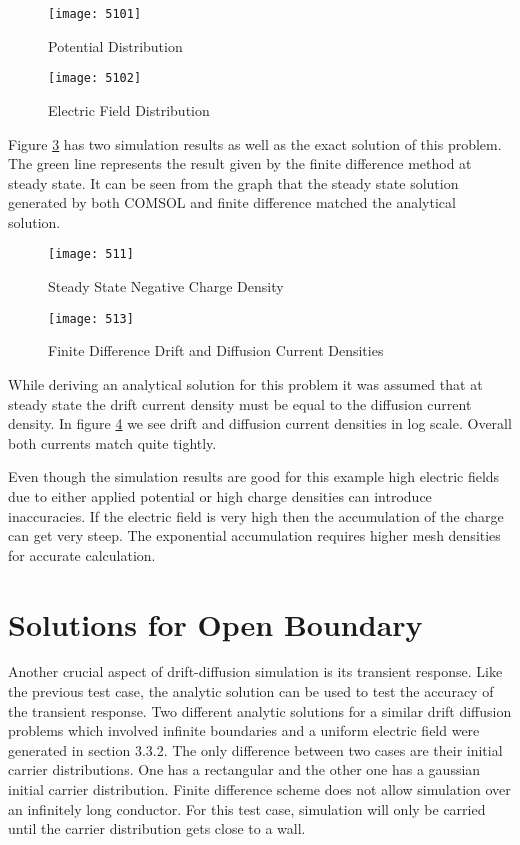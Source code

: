 \begin{doublespace}
\begin{figure}
\centering
\texttt{[image: 5101]}
\caption{Potential Distribution} 
\label{5pot}
\end{figure}

\begin{figure}
\centering
\texttt{[image: 5102]}
\caption{Electric Field Distribution} 
\label{5E}
\end{figure}

\clearpage

Figure  \ref{5ss} has two simulation results as well as the exact solution of this problem. The green line represents the result given by the finite difference method at steady state. It can be seen from the graph that the steady state solution generated by both COMSOL and finite difference matched the analytical solution.

\begin{figure}
\centering
\texttt{[image: 511]}
\caption{Steady State Negative Charge Density} 
\label{5ss}
\end{figure}

\begin{figure}[!htp]
\centering
\texttt{[image: 513]}
\caption{Finite Difference Drift and Diffusion Current Densities}
 \label{5curdens}
\end{figure}

While deriving an analytical solution for this problem it was assumed that at steady state the drift current density must be equal to the diffusion current density. In figure \ref{5curdens} we see drift and diffusion current densities in log scale. Overall both currents match quite tightly.

Even though the simulation results are good for this example high electric fields due to either applied potential or high charge densities can introduce inaccuracies. If the electric field is very high then the accumulation of the charge can get very steep. The exponential accumulation requires higher mesh densities for accurate calculation.

\clearpage
\section{Solutions for Open Boundary}
Another crucial aspect of drift-diffusion simulation is its transient response. Like the previous test case, the analytic solution can be used to test the accuracy of the transient response. Two different analytic solutions for a similar drift diffusion problems which involved infinite boundaries and a uniform electric field were generated in section 3.3.2. The only difference between two cases are their initial carrier distributions. One has a rectangular and the other one has a gaussian initial carrier distribution. Finite difference scheme does not allow simulation over an infinitely long conductor. For this test case, simulation will only be carried until the carrier distribution gets close to a wall.   


\end{doublespace}

